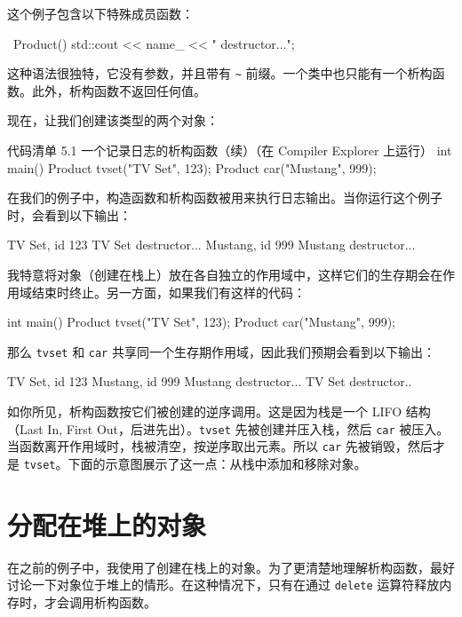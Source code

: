 这个例子包含以下特殊成员函数：

\begin{codebox}[cpp]
~Product() { std::cout << name_ << " destructor...\n"; }
\end{codebox}

这种语法很独特，它没有参数，并且带有 \texttt{\textasciitilde} 前缀。一个类中也只能有一个析构函数。此外，析构函数不返回任何值。

现在，让我们创建该类型的两个对象：

\begin{codeboxt}[cpp]{代码清单 5.1 一个记录日志的析构函数（续）（在 Compiler Explorer 上运行）}
int main() {
{
Product tvset("TV Set", 123);
}
{
Product car("Mustang", 999);
}
}
\end{codeboxt}

在我们的例子中，构造函数和析构函数被用来执行日志输出。当你运行这个例子时，会看到以下输出：

\begin{codebox}[cpp]
TV Set, id 123
TV Set destructor...
Mustang, id 999
Mustang destructor...
\end{codebox}

我特意将对象（创建在栈上）放在各自独立的作用域中，这样它们的生存期会在作用域结束时终止。另一方面，如果我们有这样的代码：

\begin{codebox}[cpp]
int main() {
Product tvset("TV Set", 123);
Product car("Mustang", 999);
}
\end{codebox}

那么 \texttt{tvset} 和 \texttt{car} 共享同一个生存期作用域，因此我们预期会看到以下输出：

\begin{codebox}[cpp]
TV Set, id 123
Mustang, id 999
Mustang destructor...
TV Set destructor..
\end{codebox}

如你所见，析构函数按它们被创建的逆序调用。这是因为栈是一个 LIFO 结构（Last In, First Out，后进先出）。\texttt{tvset} 先被创建并压入栈，然后 \texttt{car} 被压入。当函数离开作用域时，栈被清空，按逆序取出元素。所以 \texttt{car} 先被销毁，然后才是 \texttt{tvset}。下面的示意图展示了这一点：从栈中添加和移除对象。

\section{分配在堆上的对象}

在之前的例子中，我使用了创建在栈上的对象。为了更清楚地理解析构函数，最好讨论一下对象位于堆上的情形。在这种情况下，只有在通过 \texttt{delete} 运算符释放内存时，才会调用析构函数。

